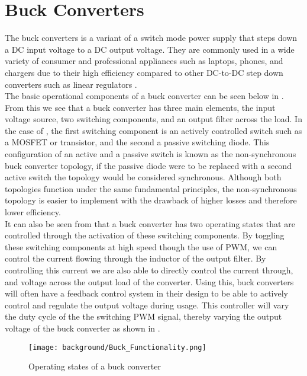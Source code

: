 \section{Buck Converters}\label{S:buck_back}

The buck converters is a variant of a switch mode power supply that steps down a DC input voltage to a DC output voltage. They are commonly used in a wide variety of consumer and professional appliances such as laptops, phones, and chargers due to their high efficiency compared to other DC-to-DC step down converters such as linear regulators \cite{Mohan2012}.\\

The basic operational components of a buck converter can be seen below in . From this we see that a buck converter has three main elements, the input voltage source, two switching components, and an output filter across the load. In the case of , the first switching component is an actively controlled switch such as a MOSFET or transistor, and the second a passive switching diode. This configuration of an active and a passive switch is known as the non-synchronous buck converter topology, if the passive diode were to be replaced with a second active switch the topology would be considered synchronous. Although both topologies function under the same fundamental principles, the non-synchronous topology is easier to implement with the drawback of higher losses and therefore lower efficiency.\\

It can also be seen from  that a buck converter has two operating states that are controlled through the activation of these switching components. By toggling these switching components at high speed though the use of PWM, we can control the current flowing through the inductor of the output filter. By controlling this current we are also able to directly control the current through, and voltage across the output load of the converter. Using this, buck converters will often have a feedback control system in their design to be able to actively control and regulate the output voltage during usage. This controller will vary the duty cycle of the the switching PWM signal, thereby varying the output voltage of the buck converter as shown in .\\

\begin{figure}[H]
	\texttt{[image: background/Buck\_Functionality.png]}
	\caption{Operating states of a buck converter}
	\label{F:buck_func}
\end{figure}


